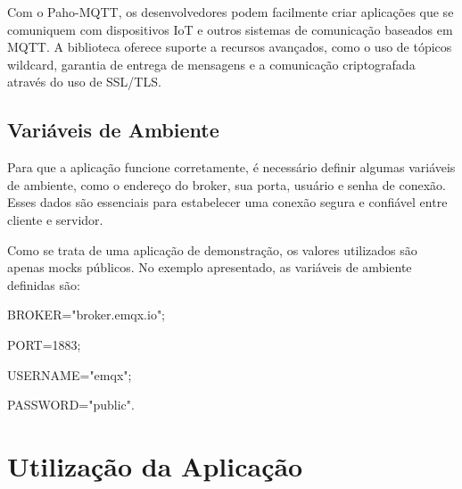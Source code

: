 \documentclass[12pt]{article}
\begin{document}
Com o Paho-MQTT, os desenvolvedores podem facilmente criar aplicações que se comuniquem com dispositivos IoT e outros sistemas de comunicação baseados em MQTT. A biblioteca oferece suporte a recursos avançados, como o uso de tópicos wildcard, garantia de entrega de mensagens e a comunicação criptografada através do uso de SSL/TLS.

\subsection{Variáveis de Ambiente}

Para que a aplicação funcione corretamente, é necessário definir algumas variáveis de ambiente, como o endereço do broker, sua porta, usuário e senha de conexão. Esses dados são essenciais para estabelecer uma conexão segura e confiável entre cliente e servidor.

Como se trata de uma aplicação de demonstração, os valores utilizados são apenas mocks públicos. No exemplo apresentado, as variáveis de ambiente definidas são:

BROKER="broker.emqx.io";

PORT=1883;

USERNAME="emqx";

PASSWORD="public".

\section{Utilização da Aplicação}
\end{document}
